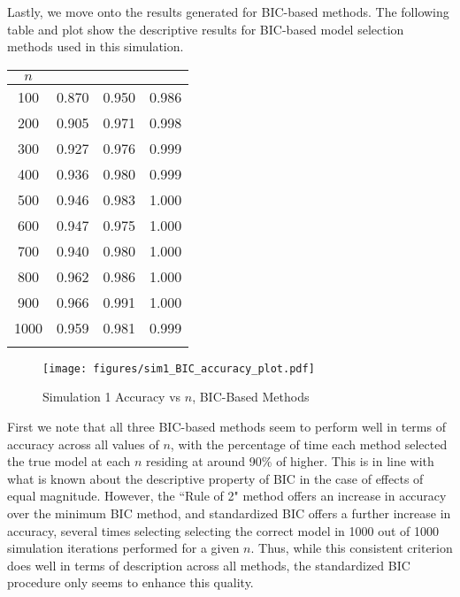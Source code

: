 		Lastly, we move onto the results generated for BIC-based methods. The following table and plot show the descriptive results for BIC-based model selection methods used
		in this simulation.

		\begin{table}[H]
			\centering
			\small\addtolength{\tabcolsep}{-3pt}
			\setlength\extrarowheight{-3pt}
			{
			\begin{tabular}{ c|c|c|c}
			$n$ & \vtop{\hbox{\strut Minimum BIC}\hbox{\strut Accuracy}} & \vtop{\hbox{\strut BIC Rule of 2}\hbox{\strut Accuracy}} & \vtop{\hbox{\strut Standardized BIC} \hbox{\strut Accuracy}} \\
			 \hline
			 100 & 0.870 & 0.950 & 0.986 \\
			 200 & 0.905 & 0.971 & 0.998 \\
			 300 & 0.927 & 0.976 & 0.999 \\
			 400 & 0.936 & 0.980 & 0.999 \\
			 500 & 0.946 & 0.983 & 1.000 \\
			 600 & 0.947 & 0.975 & 1.000 \\
			 700 & 0.940 & 0.980 & 1.000 \\
			 800 & 0.962 & 0.986 & 1.000 \\
			 900 & 0.966 & 0.991 & 1.000 \\
			1000 & 0.959 & 0.981 & 0.999 \\
			 \Xhline{3\arrayrulewidth}
			\end{tabular}
			}
		\end{table}

		\begin{figure}[H]
			\centering
			\captionsetup{justification=centering}
			\texttt{[image: figures/sim1\_BIC\_accuracy\_plot.pdf]}
			\caption{\label{fig:sim1_bic_accuracy_plot} Simulation 1 Accuracy vs $n$, BIC-Based Methods}
		\end{figure}

		First we note that all three BIC-based methods seem to perform well in terms of accuracy across all values of $n$, with the percentage of time each method selected the true model
		at each $n$ residing at around 90\% of higher. This is in line with what is known about the descriptive property of BIC in the case of effects of equal magnitude. However, the
		``Rule of 2" method offers an increase in accuracy over the minimum BIC method, and standardized BIC offers a further increase in accuracy, several times selecting selecting the
		correct model in 1000 out of 1000 simulation iterations performed for a given $n$. Thus, while this consistent criterion does well in terms of description across all methods, the
		standardized BIC procedure only seems to enhance this quality.
		
